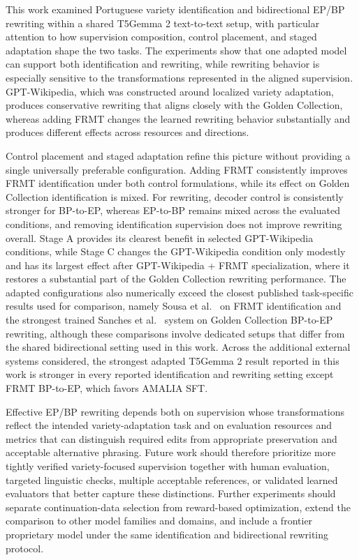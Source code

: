 \documentclass[acmtog,nonacm]{acmart}
\begin{document}
This work examined Portuguese variety identification and bidirectional EP/BP rewriting within a shared T5Gemma 2 text-to-text setup, with particular attention to how supervision composition, control placement, and staged adaptation shape the two tasks. The experiments show that one adapted model can support both identification and rewriting, while rewriting behavior is especially sensitive to the transformations represented in the aligned supervision. GPT-Wikipedia, which was constructed around localized variety adaptation, produces conservative rewriting that aligns closely with the Golden Collection, whereas adding FRMT changes the learned rewriting behavior substantially and produces different effects across resources and directions.

Control placement and staged adaptation refine this picture without providing a single universally preferable configuration. Adding FRMT consistently improves FRMT identification under both control formulations, while its effect on Golden Collection identification is mixed. For rewriting, decoder control is consistently stronger for BP-to-EP, whereas EP-to-BP remains mixed across the evaluated conditions, and removing identification supervision does not improve rewriting overall. Stage A provides its clearest benefit in selected GPT-Wikipedia conditions, while Stage C changes the GPT-Wikipedia condition only modestly and has its largest effect after GPT-Wikipedia + FRMT specialization, where it restores a substantial part of the Golden Collection rewriting performance. The adapted configurations also numerically exceed the closest published task-specific results used for comparison, namely Sousa et al.~\citeyearpar{Sousa_Almeida_Silvano_Cantante_Campos_Jorge_2025} on FRMT identification and the strongest trained Sanches et al.~\citeyearpar{sanches2024brazilianportugueseeuropeanportuguese} system on Golden Collection BP-to-EP rewriting, although these comparisons involve dedicated setups that differ from the shared bidirectional setting used in this work. Across the additional external systems considered, the strongest adapted T5Gemma 2 result reported in this work is stronger in every reported identification and rewriting setting except FRMT BP-to-EP, which favors AMALIA SFT.

Effective EP/BP rewriting depends both on supervision whose transformations reflect the intended variety-adaptation task and on evaluation resources and metrics that can distinguish required edits from appropriate preservation and acceptable alternative phrasing. Future work should therefore prioritize more tightly verified variety-focused supervision together with human evaluation, targeted linguistic checks, multiple acceptable references, or validated learned evaluators that better capture these distinctions. Further experiments should separate continuation-data selection from reward-based optimization, extend the comparison to other model families and domains, and include a frontier proprietary model under the same identification and bidirectional rewriting protocol.



\end{document}
